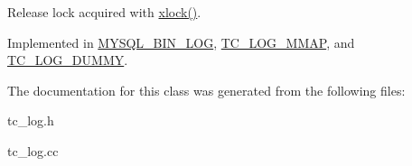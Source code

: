 Release lock acquired with \mbox{\hyperlink{classTC__LOG_aac75dc061e9aae27449e675b23c27ae3}{xlock()}}. 

Implemented in \mbox{\hyperlink{group__Binary__Log_gaee260f3856d7b1e557b91b7ecdc0b01c}{M\+Y\+S\+Q\+L\+\_\+\+B\+I\+N\+\_\+\+L\+OG}}, \mbox{\hyperlink{classTC__LOG__MMAP_a728d9b1b03c73850ba116b93677a42a8}{T\+C\+\_\+\+L\+O\+G\+\_\+\+M\+M\+AP}}, and \mbox{\hyperlink{classTC__LOG__DUMMY_a0ac9df53eb4f1ec401e0bdf9d9c95f62}{T\+C\+\_\+\+L\+O\+G\+\_\+\+D\+U\+M\+MY}}.



The documentation for this class was generated from the following files\+:\begin{DoxyCompactItemize}
\item 
tc\+\_\+log.\+h\item 
tc\+\_\+log.\+cc\end{DoxyCompactItemize}
